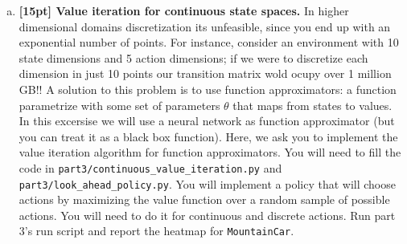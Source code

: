 \documentclass{article}
\begin{document}
\begin{enumerate}[(a)]

\item {\bf [15pt] Value iteration for continuous state spaces.} In higher dimensional domains discretization its unfeasible, since you end up with an exponential number of points. For instance, consider an environment with 10 state dimensions and 5 action dimensions; if we were to discretize each dimension in just 10 points our transition matrix wold ocupy over 1 million GB!! A solution to this problem is to use function approximators: a function parametrize with some set of parameters $\theta$ that maps from states to values. In this excersise we will use a neural network as function approximator (but you can treat it as a black box function). Here, we ask you to implement the value iteration algorithm for function approximators. You will need to fill the code in \texttt{part3/continuous\_value\_iteration.py} and \texttt{part3/look\_ahead\_policy.py}. You will implement a policy that will choose actions by maximizing the value function over a random sample of possible actions. You will need to do it for continuous and discrete actions. Run part 3's run script and report the heatmap for \texttt{MountainCar}.


\end{enumerate}
\end{document}
